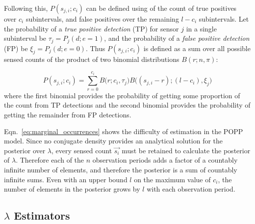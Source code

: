 Following this, $P(s_{j,i} ; c_i)$ can be defined using of the count of true  positives over $c_i$ subintervals, and false positives over the remaining $l-c_i$ subintervals. 
% 
Let the probability of a \textit{true positive detection} (TP) for sensor $j$ in a single subinterval be $\tau_j = P_j(d;e=1)$, and the probability of a \textit{false positive detection} (FP) be $\xi_j = P_j(d;e=0)$. Thus $P(s_{j,i} ; c_i)$ is defined as a sum over all possible sensed counts of the product of two binomial distributions $B(r ; n,\pi)$: 

\begin{equation}
	\label{eq:joint_binomial_distribution}
    P(s_{j,i} ; c_i) \! = \! \! \! \displaystyle\sum_{r = 0}^{c_{i}} \! \! B\Big(r ; c_i, \tau_j\Big) B\Big((s_{j,i} - r) ; (l - c_{i}), \xi_j \Big)
\end{equation}
\noindent where the first binomial provides the probability of getting some proportion of the count from  TP detections and the second binomial provides the probability of getting the remainder from FP detections. 


Eqn.~\ref{eq:marginal_occurrences} shows the difficulty of estimation in the POPP model. Since no conjugate density provides an analytical solution for the posterior over $\lambda$, every sensed count $\vec{s_i}$ must be retained to calculate the posterior of $\lambda$. Therefore each of the $n$ observation periods adds a factor of a countably infinite number of elements, and therefore the posterior is a sum of countably infinite sums. Even with an upper bound $l$ on the maximum value of $c_i$, the number of elements in the posterior grows by $l$ with each observation period.
% 
\subsection*{$\lambda$ Estimators}\label{sec:estimators}

